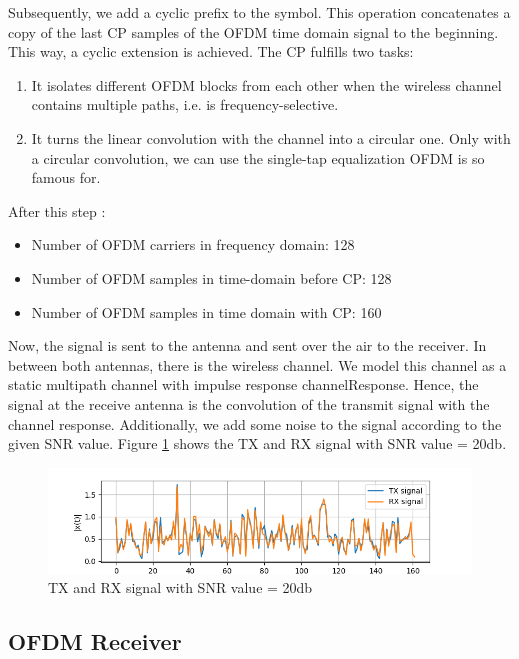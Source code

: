 Subsequently, we add a cyclic prefix to the symbol. This operation concatenates a copy of the last CP samples of the OFDM time domain signal to the beginning. This way, a cyclic extension is achieved. The CP fulfills two tasks:
\begin{enumerate}
    \item It isolates different OFDM blocks from each other when the wireless channel contains multiple paths, i.e. is frequency-selective.
    \item It turns the linear convolution with the channel into a circular one. Only with a circular convolution, we can use the single-tap equalization OFDM is so famous for.
\end{enumerate}

After this step :
\begin{itemize}
    \item Number of OFDM carriers in frequency domain: 128
    \item Number of OFDM samples in time-domain before CP: 128
    \item Number of OFDM samples in time domain with CP: 160
\end{itemize}

Now, the signal is sent to the antenna and sent over the air to the receiver. In between both antennas, there is the wireless channel. We model this channel as a static multipath channel with impulse response channelResponse. Hence, the signal at the receive antenna is the convolution of the transmit signal with the channel response. Additionally, we add some noise to the signal according to the given SNR value. Figure \ref{tx_rx} shows the TX and RX signal with SNR value = 20db.

\begin{figure}[htbp]
    \centering
    \includegraphics[width=\textwidth]{../Source/results/tx_rx.png}
    \caption{TX and RX signal with SNR value = 20db}
    \label{tx_rx}
\end{figure}

\subsection{OFDM Receiver}

